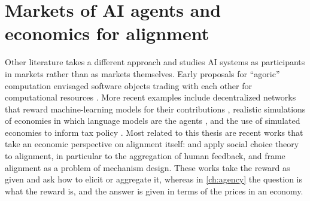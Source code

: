 \section{Markets of AI agents and economics for alignment}\label{litrev:sec:econ-alignment}
\begin{draftblock}
Other literature takes a different approach and studies AI systems as participants in markets rather than as markets themselves. Early proposals for ``agoric'' computation envisaged software objects trading with each other for computational resources \citep{millerMarketsComputationAgoric1988}. More recent examples include decentralized networks that reward machine-learning models for their contributions \citep{raoBitTensorPeertoPeerIntelligence2021}, realistic simulations of economies in which language models are the agents \citep{liEconAgentLargeLanguage2024a}, and the use of simulated economies to inform tax policy \citep{zhengAIEconomistOptimal2021}. Most related to this thesis are recent works that take an economic perspective on alignment itself: \citet{conitzerPositionSocialChoice2024} and \citet{geAxiomsAIAlignment2024a} apply social choice theory to alignment, in particular to the aggregation of human feedback, and \citet{bergemannMechanismDesignAlignment2026} frame alignment as a problem of mechanism design. These works take the reward as given and ask how to elicit or aggregate it, whereas in \cref{ch:agency} the question is what the reward is, and the answer is given in terms of the prices in an economy.
\end{draftblock}
